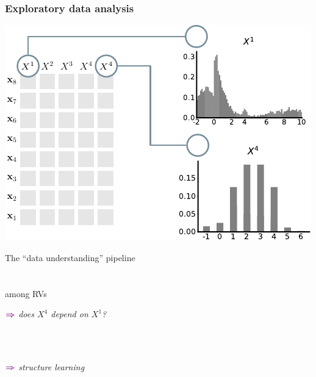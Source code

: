 \documentclass[xcolor={usenames,dvipsnames,svgnames}, compress, aspectratio=169, 11pt]{beamer}
\newcommand{\comment}[3][\small]{\begin{minipage}{1\linewidth}
          \raggedleft
          {
            $\color{violet}\boldsymbol\Rightarrow$
            #1
            {\emph{#2}}
          }
      \end{minipage}#3\\
}
\begin{document}
\begin{frame}[t, htt=bgrey2]
  \frametitle{Exploratory data analysis}

  \large
  \begin{minipage}[t]{0.6\linewidth}
    \includegraphics[width=.99\linewidth]{figures/abda-hist-type}
  \end{minipage}\hfill\begin{minipage}[t]{0.4\linewidth}
    \vspace{-150pt}
    {The ``data understanding'' pipeline}\\[5pt]
    \\
    \\
     among
    RVs\\
    \comment[\normalsize]{does $X^{4}$ depend on $X^{1}$?}{}\\
    \comment[\normalsize]{structure learning}{}\\
  \end{minipage}  
\end{frame}
\end{document}
